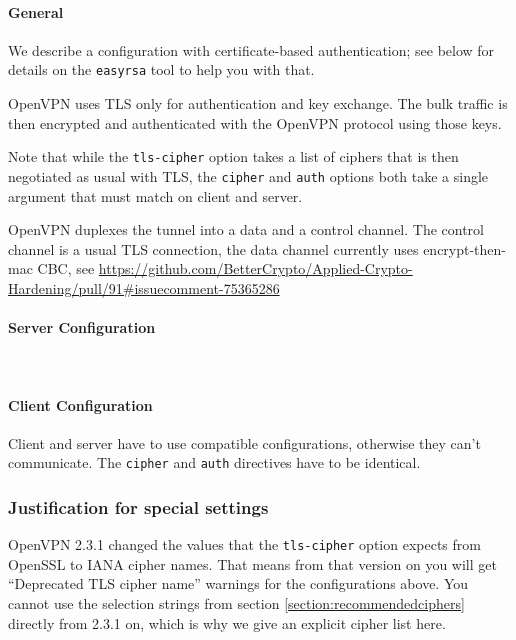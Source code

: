 \paragraph{General}
We describe a configuration with certificate-based authentication; see
below for details on the \verb|easyrsa| tool to help you with that.

OpenVPN uses TLS only for authentication and key exchange. The
bulk traffic is then encrypted and authenticated with the OpenVPN
protocol using those keys.

Note that while the \verb|tls-cipher| option takes a list of ciphers
that is then negotiated as usual with TLS, the \verb|cipher|
and \verb|auth| options both take a single argument that must match on
client and server.

OpenVPN duplexes the tunnel into a data and a control channel. The control
channel is a usual TLS connection, the data channel currently uses 
encrypt-then-mac CBC, see \url{https://github.com/BetterCrypto/Applied-Crypto-Hardening/pull/91#issuecomment-75365286}


\paragraph{Server Configuration}
~\\

\paragraph{Client Configuration}
Client and server have to use compatible configurations, otherwise they can't communicate.
The \verb|cipher| and \verb|auth| directives have to be identical.


\subsubsection{Justification for special settings}
OpenVPN 2.3.1 changed the values that the \verb|tls-cipher| option
expects from OpenSSL to IANA cipher names. That means from that
version on you will get ``Deprecated TLS cipher name'' warnings for
the configurations above. You cannot use the selection strings from
section \ref{section:recommendedciphers} directly from 2.3.1 on, which
is why we give an explicit cipher list here.


